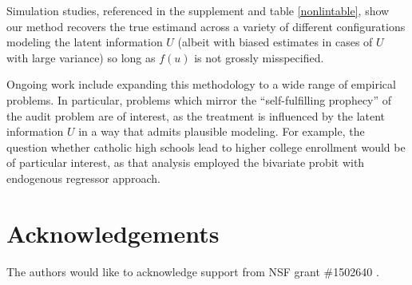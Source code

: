 \documentclass[aoas,preprint, 11pt, dvipsnames, table, x11name]{imsart}
\theoremstyle{remark}
\begin{document}
Simulation studies, referenced in the supplement and table \ref{nonlintable}, show our method recovers the true estimand across a variety of different configurations modeling the latent information $U$ (albeit with biased estimates in cases of $U$ with large variance) so long as $f(u)$ is not grossly misspecified.  %

Ongoing work include expanding this methodology to a wide range of empirical problems.  In particular, problems which mirror the ``self-fulfilling prophecy'' of the audit problem are of interest,  as the treatment is influenced by the latent information $U$ in a way that admits plausible modeling. For example, the question whether catholic high schools lead to higher college enrollment \citep{Evans-Schwab-1995} would be of particular interest, as that analysis employed the bivariate probit with endogenous regressor approach.


 










\section*{Acknowledgements}
The authors would like to acknowledge support from NSF grant \#1502640 .

\clearpage
\appendix









































\clearpage 

\end{document}
